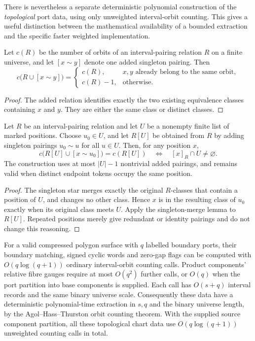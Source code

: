 There is nevertheless a separate deterministic polynomial construction of
the \emph{topological} port data, using only unweighted interval-orbit
counting.  This gives a useful distinction between the mathematical
availability of a bounded extraction and the specific faster weighted
implementation.

\begin{lemma}
Let $c(R)$ be the number of orbits of an interval-pairing relation $R$ on a
finite universe, and let $[x\sim y]$ denote one added singleton pairing.
Then
\[
 c\bigl(R\cup[x\sim y]\bigr)=
 \begin{cases}
 c(R),&x,y\text{ already belong to the same orbit},\\
 c(R)-1,&\text{otherwise}.
 \end{cases}
\]
\end{lemma}

\begin{proof}
The added relation identifies exactly the two existing equivalence classes
containing $x$ and $y$.  They are either the same class or distinct classes.
\end{proof}

\begin{lemma}
\label{lem:orbit-star-membership}
Let $R$ be an interval-pairing relation and let $U$ be a nonempty finite
list of marked positions.  Choose $u_0\in U$, and let $R[U]$ be obtained
from $R$ by adding singleton pairings $u_0\sim u$ for all $u\in U$.
Then, for any position $x$,
\[
 c\bigl(R[U]\cup[x\sim u_0]\bigr)=c(R[U])
 \quad\Longleftrightarrow\quad
 [x]_R\cap U\ne\varnothing.
\]
The construction uses at most $|U|-1$ nontrivial added pairings, and remains
valid when distinct endpoint tokens occupy the same position.
\end{lemma}

\begin{proof}
The singleton star merges exactly the original $R$-classes that contain a
position of $U$, and changes no other class.  Hence $x$ is in the resulting
class of $u_0$ exactly when its original class meets $U$.  Apply the
singleton-merge lemma to $R[U]$.  Repeated positions merely give redundant
or identity pairings and do not change this reasoning.
\end{proof}

\begin{theorem}
For a valid compressed polygon surface with $q$ labelled boundary ports,
their boundary matching, signed cyclic words and zero-gap flags can be
computed with $O(q\log(q+1))$ ordinary interval-orbit counting calls.  Product
components' relative fibre gauges require at most $O(q^2)$ further calls,
or $O(q)$ when the port partition into base components is supplied.  Each
call has $O(s+q)$ interval records and the same binary universe scale.
Consequently these data have a deterministic polynomial-time extraction in
$s,q$ and the binary universe length, by the Agol--Hass--Thurston orbit
counting theorem.  With the supplied source component partition, all these
topological chart data use $O(q\log(q+1))$ unweighted counting calls in total.
\end{theorem}

